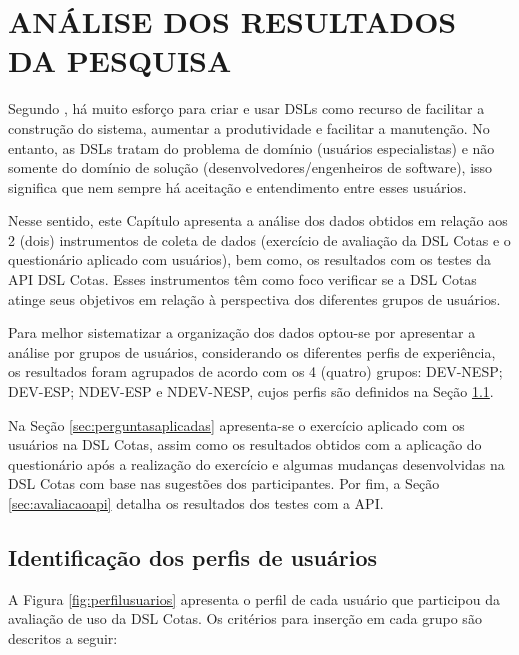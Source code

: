 \chapter{ANÁLISE DOS RESULTADOS DA  PESQUISA}
\label{chap:analise}

Segundo , há muito esforço para criar e usar \gls{DSL}s como recurso de facilitar a construção do sistema, aumentar a produtividade e facilitar a manutenção. No entanto, as \gls{DSL}s tratam do problema de domínio (usuários especialistas) e não somente do domínio de solução (desenvolvedores/engenheiros de software), isso significa que nem sempre há aceitação e entendimento entre esses usuários.

Nesse sentido, este Capítulo apresenta a análise dos dados obtidos em relação aos 2 (dois) instrumentos de coleta de dados (exercício de avaliação da DSL Cotas e o questionário aplicado com usuários), bem como, os resultados com os testes da API DSL Cotas. Esses instrumentos têm como foco verificar se a DSL Cotas atinge seus objetivos em relação à perspectiva dos diferentes grupos de usuários. 

Para melhor sistematizar a organização dos dados optou-se por apresentar a análise por grupos de usuários, considerando os diferentes perfis de experiência, os resultados foram agrupados de acordo com os 4 (quatro) grupos:  DEV-NESP; DEV-ESP; NDEV-ESP e NDEV-NESP, cujos perfis são definidos na Seção \ref{sec:idperfis}. 

Na Seção \ref{sec:perguntasaplicadas} apresenta-se o exercício aplicado com os usuários na DSL Cotas, assim como os resultados obtidos com a aplicação do questionário após a realização do exercício e algumas mudanças desenvolvidas na DSL Cotas com base nas sugestões dos participantes. Por fim, a Seção \ref{sec:avaliacaoapi} detalha os resultados dos testes com a API.


\section{Identificação dos perfis de usuários}
\label{sec:idperfis}


A Figura \ref{fig:perfilusuarios} apresenta o perfil de cada usuário que participou da avaliação de uso da DSL Cotas. Os critérios para inserção em cada grupo são descritos a seguir:

